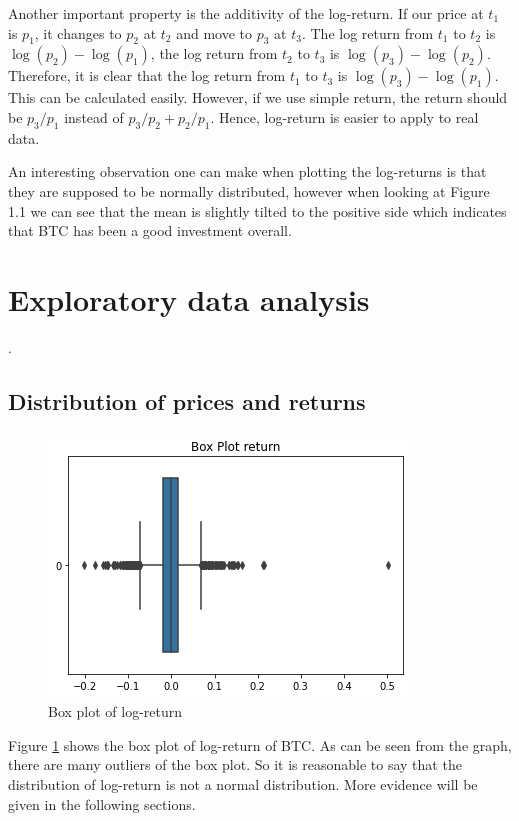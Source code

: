 \documentclass[twoside]{report}
\begin{document}
\begin{spacing}{1}
Another important property is the additivity of the log-return. If our price at $t_1$ is $p_1$, it changes to $p_2$ at $t_2$ and move to $p_3$ at $t_3$. The log return from $t_1 $ to $t_2$ is $\log (p_2) - \log (p_1)$, the log return from $t_2 $ to $t_3$ is $\log (p_3) - \log (p_2)$. Therefore, it is clear that the log return from $t_1 $ to $t_3$ is $\log (p_3) - \log (p_1)$. This can be calculated easily. However, if we use simple return, the return should be $p_3/p_1$ instead of $p_3/p_2 + p_2/p_1$. Hence, log-return is easier to apply to real data.

 An interesting observation one can make when plotting the log-returns is that they are supposed to be normally distributed, however when looking at Figure 1.1 we can see that the mean is slightly tilted to the positive side which indicates that BTC has been a good investment overall.
 
 
 \section{Exploratory data analysis}
.
\subsection{Distribution of prices and returns}

\begin{figure}[!htbp]
    \centering
    \includegraphics[scale = 0.5]{Images/Box Plot of Return.png}
    \caption{Box plot of log-return}
    \label{log return box}
\end{figure}

Figure \ref{log return box} shows the box plot of log-return of BTC. As can be seen from the graph, there are many outliers of the box plot. So it is reasonable to say that the distribution of log-return is not a normal distribution. More evidence will be given in the following sections.


\end{spacing}
\end{document}
